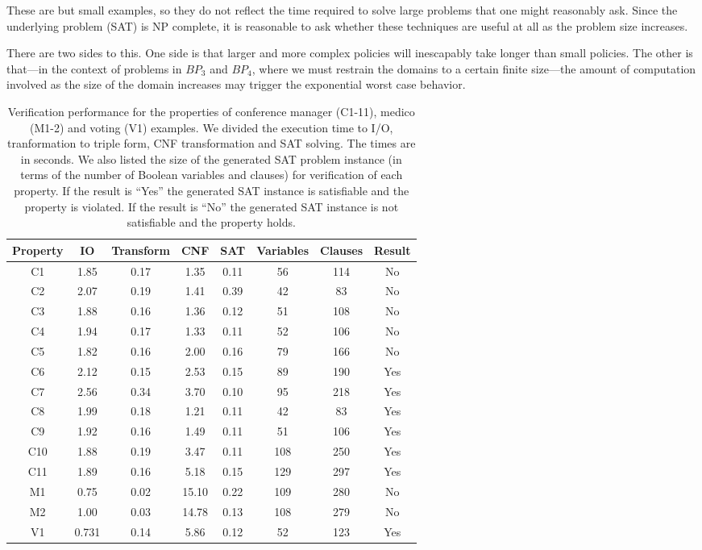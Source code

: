 These are but small examples, so they do not reflect the time required
to solve large problems that one might reasonably ask.  Since the
underlying problem (SAT) is NP complete, it is reasonable to ask
whether these techniques are useful at all as the problem size
increases.

There are two sides to this.  One side is that larger and more complex
policies will inescapably take longer than small policies.  The other
is that---in the context of problems in $BP_3$ and $BP_4$, where we
must restrain the domains to a certain finite size---the amount of
computation involved as the size of the domain increases may trigger
the exponential worst case behavior.

\begin{table*}[t]
\centering
\begin{tabular}{c|cccc|cc|c}
  Property & IO & Transform & CNF & SAT & Variables
  & Clauses & Result \\
  \hline
  C1 & 1.85 & 0.17 & 1.35 & 0.11 & 56 & 114 & No \\
  C2 & 2.07 & 0.19 & 1.41 & 0.39 & 42 & 83  & No \\
  C3 & 1.88 & 0.16 & 1.36 & 0.12 & 51 & 108 & No \\
  C4 & 1.94 & 0.17 & 1.33 & 0.11 & 52 & 106 & No \\
  C5 & 1.82 & 0.16 & 2.00 & 0.16 &  79 & 166 & No \\
  \hline
  C6 & 2.12 & 0.15 & 2.53 & 0.15 & 89 & 190 & Yes \\
  C7 & 2.56 & 0.34 & 3.70 & 0.10 & 95 & 218 & Yes  \\
  C8 & 1.99 & 0.18 & 1.21 & 0.11 & 42 & 83 & Yes \\
  C9 & 1.92 & 0.16 & 1.49 & 0.11 & 51 & 106 & Yes \\
  C10 & 1.88 & 0.19 & 3.47 & 0.11 & 108 & 250 & Yes \\
  C11 & 1.89 & 0.16 & 5.18 & 0.15 & 129 & 297& Yes \\
  \hline
  M1 & 0.75 & 0.02 & 15.10 & 0.22 & 109 & 280 & No \\
  M2 & 1.00 & 0.03 & 14.78 & 0.13 & 108 & 279 & No \\
\hline
  V1 & 0.731 & 0.14 & 5.86 & 0.12 & 52 & 123 & Yes \\
\end{tabular}
\caption{Verification performance for the 
properties of conference manager (C1-11), medico (M1-2) and
voting (V1) examples. 
We divided the execution time to I/O, tranformation
to triple form, CNF transformation and SAT solving.
The times are in seconds.
We also listed the size of the generated SAT problem instance 
(in terms of the number of Boolean variables and clauses)
for verification of each property.
If the result is ``Yes'' the generated SAT instance is satisfiable
and the property is violated. 
If the result is ``No'' the generated SAT instance is not satisfiable
and the property holds.
}
\label{tbl:bigdata}
\end{table*}



